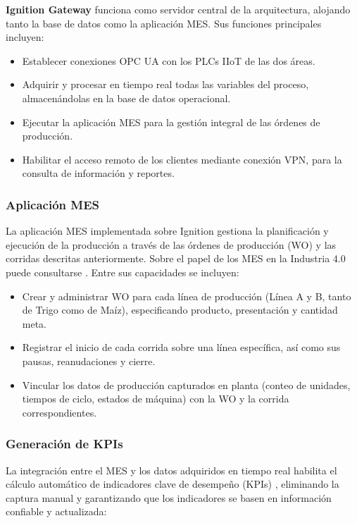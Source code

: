 \textbf{Ignition Gateway} funciona como servidor central de la arquitectura, alojando tanto la base de datos como la aplicación MES. Sus funciones principales incluyen:

\begin{itemize}
    \item Establecer conexiones OPC UA con los PLCs IIoT de las dos áreas.
    \item Adquirir y procesar en tiempo real todas las variables del proceso, almacenándolas en la base de datos operacional.
    \item Ejecutar la aplicación MES para la gestión integral de las órdenes de producción.
    \item Habilitar el acceso remoto de los clientes mediante conexión VPN, para la consulta de información y reportes.
\end{itemize}

\subsubsection{Aplicación MES}

La aplicación MES implementada sobre Ignition gestiona la planificación y ejecución de la producción a través de las órdenes de producción (WO) y las corridas descritas anteriormente. Sobre el papel de los MES en la Industria 4.0 puede consultarse \cite{dos-exploring}. Entre sus capacidades se incluyen:

\begin{itemize}
    \item Crear y administrar WO para cada línea de producción (Línea A y B, tanto de Trigo como de Maíz), especificando producto, presentación y cantidad meta.
    \item Registrar el inicio de cada corrida sobre una línea específica, así como sus pausas, reanudaciones y cierre.
    \item Vincular los datos de producción capturados en planta (conteo de unidades, tiempos de ciclo, estados de máquina) con la WO y la corrida correspondientes.
\end{itemize}

\subsubsection{Generación de KPIs}

La integración entre el MES y los datos adquiridos en tiempo real habilita el cálculo automático de indicadores clave de desempeño (KPIs) \cite{iso22400_2}, eliminando la captura manual y garantizando que los indicadores se basen en información confiable y actualizada:

